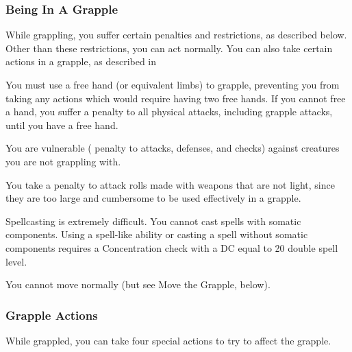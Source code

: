 \subsubsection{Being In A Grapple}
While grappling, you suffer certain penalties and restrictions, as described below. Other than these restrictions, you can act normally. You can also take certain actions in a grapple, as described in  
\begin{itemize*}
    \item You must use a free hand (or equivalent limbs) to grapple, preventing you from taking any actions which would require having two free hands. If you cannot free a hand, you suffer a  penalty to all physical attacks, including grapple attacks, until you have a free hand.
    \item You are vulnerable ( penalty to attacks, defenses, and checks) against creatures you are not grappling with.
    \item You take a  penalty to attack rolls made with weapons that are not light, since they are too large and cumbersome to be used effectively in a grapple.
    \item Spellcasting is extremely difficult. You cannot cast spells with somatic components. Using a spell-like ability or casting a spell without somatic components requires a Concentration check with a DC equal to 20 \add double spell level.
    \item You cannot move normally (but see Move the Grapple, below).
\end{itemize*}

\subsubsection{Grapple Actions}
While grappled, you can take four special actions to try to affect the grapple.

